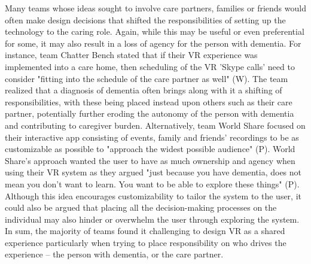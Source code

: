 Many teams whose ideas sought to involve care partners, families or friends would often make design decisions that shifted the responsibilities of setting up the technology to the caring role. Again, while this may be useful or even preferential for some, it may also result in a loss of agency for the person with dementia. For instance, team Chatter Bench stated that if their VR experience was implemented into a care home, then scheduling of the VR 'Skype calls' need to consider "fitting into the schedule of the care partner as well" (W). The team realized that a diagnosis of dementia often brings along with it a shifting of responsibilities, with these being placed instead upon others such as their care partner, potentially further eroding the autonomy of the person with dementia and contributing to caregiver burden. Alternatively, team World Share focused on their interactive app consisting of events, family and friends’ recordings to be as customizable as possible to "approach the widest possible audience" (P). World Share's approach wanted the user to have as much ownership and agency when using their VR system as they argued "just because you have dementia, does not mean you don't want to learn. You want to be able to explore these things" (P). Although this idea encourages customizability to tailor the system to the user, it could also be argued that placing all the decision-making processes on the individual may also hinder or overwhelm the user through exploring the system. In sum, the majority of teams found it challenging to design VR as a shared experience particularly when trying to place responsibility on who drives the experience – the person with dementia, or the care partner. 
